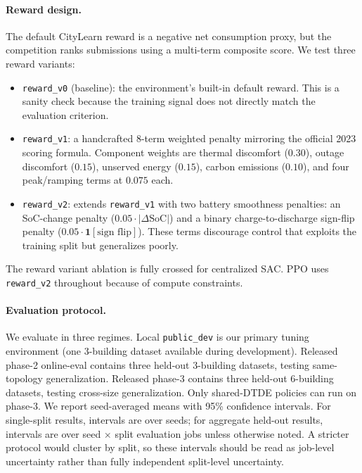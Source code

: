 \documentclass{article}
\begin{document}
\paragraph{Reward design.} The default CityLearn reward is a negative net consumption proxy, but the competition ranks submissions using a multi-term composite score. We test three reward variants:

\begin{itemize}
    \item \texttt{reward\_v0} (baseline): the environment's built-in default reward. This is a sanity check because the training signal does not directly match the evaluation criterion.
    \item \texttt{reward\_v1}: a handcrafted 8-term weighted penalty mirroring the official 2023 scoring formula. Component weights are thermal discomfort ($0.30$), outage discomfort ($0.15$), unserved energy ($0.15$), carbon emissions ($0.10$), and four peak/ramping terms at $0.075$ each.
    \item \texttt{reward\_v2}: extends \texttt{reward\_v1} with two battery smoothness penalties: an SoC-change penalty ($0.05 \cdot |\Delta \text{SoC}|$) and a binary charge-to-discharge sign-flip penalty ($0.05 \cdot \mathbf{1}[\text{sign flip}]$). These terms discourage control that exploits the training split but generalizes poorly.
\end{itemize}

The reward variant ablation is fully crossed for centralized SAC. PPO uses \texttt{reward\_v2} throughout because of compute constraints.

\paragraph{Evaluation protocol.} We evaluate in three regimes. Local \texttt{public\_dev} is our primary tuning environment (one 3-building dataset available during development). Released phase-2 online-eval contains three held-out 3-building datasets, testing same-topology generalization. Released phase-3 contains three held-out 6-building datasets, testing cross-size generalization. Only shared-DTDE policies can run on phase-3. We report seed-averaged means with 95\% confidence intervals. For single-split results, intervals are over seeds; for aggregate held-out results, intervals are over seed $\times$ split evaluation jobs unless otherwise noted. A stricter protocol would cluster by split, so these intervals should be read as job-level uncertainty rather than fully independent split-level uncertainty.
\end{document}
